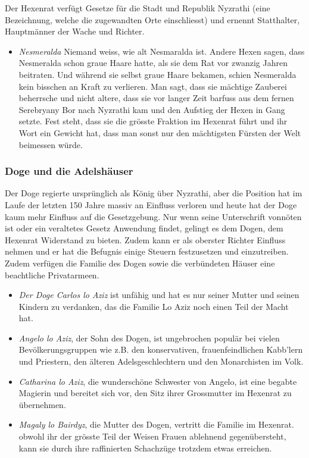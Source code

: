 \documentclass[10pt,twoside,twocolumn,openany]{book}
\begin{document}
Der Hexenrat verfügt Gesetze für die Stadt und Republik Nyzrathi (eine Bezeichnung, welche die zugewandten Orte einschliesst) und ernennt Statthalter, Hauptmänner der Wache und Richter.
\begin{itemize}
	\item\textit{Nesmeralda} Niemand weiss, wie alt Nesmaralda ist. Andere Hexen sagen, dass Nesmeralda schon graue Haare hatte, als sie dem Rat vor zwanzig Jahren beitraten. Und während sie selbst graue Haare bekamen, schien Nesmeralda kein bisschen an Kraft zu verlieren. Man sagt, dass sie mächtige Zauberei beherrsche und nicht altere, dass sie vor langer Zeit barfuss aus dem fernen Serebryany Bor nach Nyzrathi kam und den Aufstieg der Hexen in Gang setzte. Fest steht, dass sie die grösste Fraktion im Hexenrat führt und ihr Wort ein Gewicht hat, dass man sonst nur den mächtigsten Fürsten der Welt beimessen würde.
\end{itemize}

\subsubsection{Doge und die Adelshäuser} Der Doge regierte ursprünglich als König über Nyzrathi, aber die Position hat im Laufe der letzten 150 Jahre massiv an Einfluss verloren und heute hat der Doge kaum mehr Einfluss auf die Gesetzgebung. Nur wenn seine Unterschrift vonnöten ist oder ein veraltetes Gesetz Anwendung findet, gelingt es dem Dogen, dem Hexenrat Widerstand zu bieten. Zudem kann er als oberster Richter Einfluss nehmen und er hat die Befugnis einige Steuern festzusetzen und einzutreiben. Zudem verfügen die Familie des Dogen sowie die verbündeten Häuser eine beachtliche Privatarmeen.

\begin{itemize}
	\item\textit{Der Doge Carlos lo Aziz} ist unfähig und hat es nur seiner Mutter und seinen Kindern zu verdanken, das die Familie Lo Aziz noch einen Teil der Macht hat.
	\item\textit{Angelo lo Aziz}, der Sohn des Dogen, ist ungebrochen populär bei vielen Bevölkerungsgruppen wie z.B. den konservativen, frauenfeindlichen Kabb'lern und Priestern, den älteren Adelsgeschlechtern und den Monarchisten im Volk.
	\item\textit{Catharina lo Aziz}, die wunderschöne Schwester von Angelo, ist eine begabte Magierin und bereitet sich vor, den Sitz ihrer Grossmutter im Hexenrat zu übernehmen.
	\item\textit{Magaly lo Bairdyz},  die Mutter des Dogen,  vertritt die Familie im Hexenrat. obwohl ihr der grösste Teil der Weisen Frauen ablehnend gegenübersteht, kann sie durch ihre raffinierten Schachzüge trotzdem etwas erreichen.
\end{itemize}
\end{document}
